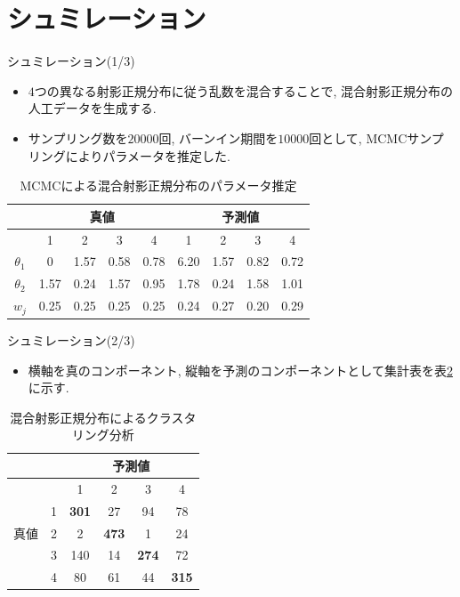 \documentclass[dvipdfmx]{beamer} %
\begin{document}
\section{シュミレーション}
\begin{frame}{シュミレーション(1/3)}

\begin{itemize}
\item
$4$つの異なる射影正規分布に従う乱数を混合することで, 混合射影正規分布の人工データを生成する.
\item
サンプリング数を$20000$回, バーンイン期間を$10000$回として, MCMCサンプリングによりパラメータを推定した.

\end{itemize}

\begin{table}[tbp]
\begin{center}
\caption{MCMCによる混合射影正規分布のパラメータ推定}
\label{cross1}
\begin{tabular}{c|c c c c|c c c c}
\hline
  & \multicolumn{4}{c}{真値} & \multicolumn{4}{c}{予測値}\\ \hline
  & 1 & 2 & 3 & 4 & 1 & 2 & 3 & 4 \\ \hline 
$\theta_1$ & 0 & 1.57 & 0.58 & 0.78 & 6.20 & 1.57 & 0.82 & 0.72 \\ 
$\theta_2$ & 1.57 & 0.24 & 1.57 & 0.95 & 1.78 & 0.24 & 1.58 & 1.01\\
$w_j$ & 0.25 & 0.25 & 0.25 & 0.25 & 0.24 & 0.27 & 0.20 & 0.29\\
\hline
\end{tabular}
\end{center}
\end{table}

\end{frame}

\begin{frame}{シュミレーション(2/3)}

\begin{itemize}
	\item 
	横軸を真のコンポーネント, 縦軸を予測のコンポーネントとして集計表を表\ref{cross2}に示す.
\end{itemize}

\begin{table}[tbp]
\begin{center}
\caption{混合射影正規分布によるクラスタリング分析}
\label{cross2}
\begin{tabular}{c|c|c c c c}
\hline
 &  & \multicolumn{4}{c}{予測値} \\ \hline
 &  & 1 & 2 & 3 & 4  \\ \hline 
 & 1 &  \textbf{301} & 27  & 94 & 78 \\ 
真値
 & 2 & 2 & \textbf{473} & 1 & 24 \\
 & 3 & 140 & 14 & \textbf{274} &72 \\ 
 & 4 & 80 & 61 & 44 & \textbf{315} \\ 
\hline
\end{tabular}
\end{center}
\end{table}
\end{frame}
\end{document}
